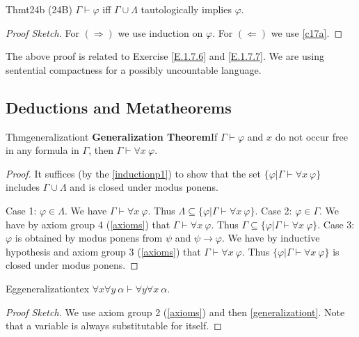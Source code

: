 \begin{reference}{Thm}{t24b}
  (24B) $\Gamma\vdash \varphi$ iff $\Gamma\cup \Lambda$ tautologically implies $\varphi$.
\end{reference}

\begin{proof}[Proof Sketch]
  For $(\Rightarrow)$ we use induction on $\varphi$. For $(\Leftarrow)$ we use \ref{c17a}.
\end{proof}

The above proof is related to Exercise \ref{E.1.7.6} and \ref{E.1.7.7}. We are using sentential compactness for a possibly uncountable language.

\subsection*{Deductions and Metatheorems}

\begin{reference}{Thm}{generalizationt}
  \textbf{Generalization Theorem}\quad If $\Gamma\vdash \varphi$ and $x$ do not occur free in any formula in $\Gamma$, then $\Gamma\vdash\forall x\ \varphi$.
\end{reference}

\begin{proof}
  It suffices (by the \ref{inductionp1}) to show that the set $\{\varphi|\Gamma\vdash\forall x\ \varphi\}$ includes $\Gamma\cup \Lambda$ and is closed under modus ponens.

  Case 1: $\varphi\in \Lambda$. We have $\Gamma\vdash\forall x\ \varphi$. Thus $\Lambda\subseteq\{\varphi|\Gamma\vdash\forall x\ \varphi\}$.\newline
  Case 2: $\varphi\in \Gamma$. We have by axiom group 4 (\ref{axioms}) that $\Gamma\vdash\forall x\ \varphi$. Thus $\Gamma\subseteq\{\varphi|\Gamma\vdash\forall x\ \varphi\}$.\newline
  Case 3: $\varphi$ is obtained by modus ponens from $\psi$ and $\psi\rightarrow \varphi$. We have by inductive hypothesis and axiom group 3 (\ref{axioms}) that $\Gamma\vdash\forall x\ \varphi$. Thus $\{\varphi|\Gamma\vdash\forall x\ \varphi\}$ is closed under modus ponens.
\end{proof}

\begin{reference}{Eg}{generalizationtex}
  $\forall x\forall y\ \alpha\vdash\forall y\forall x\ \alpha$.
\end{reference}

\begin{proof}[Proof Sketch]
  We use axiom group 2 (\ref{axioms}) and then \ref{generalizationt}. Note that a variable is always substitutable for itself.
\end{proof}

